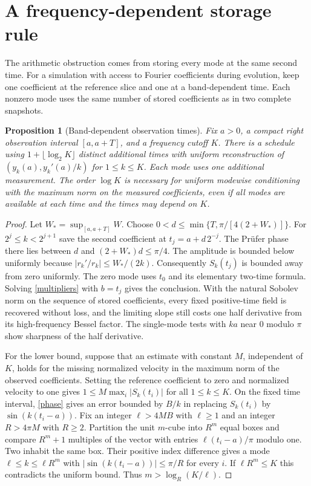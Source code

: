 \documentclass[11pt]{article}
\newtheorem{proposition}{Proposition}
\begin{document}
\section{A frequency-dependent storage rule}
\label{schedule}
The arithmetic obstruction comes from storing every mode at the
same second time. For a simulation with access to Fourier coefficients
during evolution, keep one coefficient at the reference slice and
one at a band-dependent time. Each nonzero mode uses the same number
of stored coefficients as in two complete snapshots.

\begin{proposition}[Band-dependent observation times]
Fix $a>0$, a compact right observation interval $[a,a+T]$, and a
frequency cutoff $K$. There is a schedule using
$1+\lfloor\log_2 K\rfloor$ distinct additional times with uniform
reconstruction of $(y_k(a),y_k'(a)/k)$ for $1\le k\le K$.
Each mode uses one additional measurement.
The order $\log K$ is necessary for uniform modewise conditioning
with the maximum norm on the measured coefficients, even if all modes
are available at each time and the times may depend on $K$.
\end{proposition}

\begin{proof}
Let $W_* = \sup_{[a,a+T]} W$. Choose $0<d\le
\min\{T,\pi/[4(2+W_*)]\}$. For $2^j\le k<2^{j+1}$
save the second coefficient at $t_j=a+d\,2^{-j}$.
The Pr\"ufer phase there lies between $d$ and $(2+W_*)d\le\pi/4$.
The amplitude is bounded below uniformly because
$|r_k'/r_k|\le W_*/(2k)$.
Consequently $S_k(t_j)$ is bounded away from zero uniformly.
The zero mode uses $t_0$ and its elementary two-time formula.
Solving \eqref{multipliers} with $b=t_j$ gives the conclusion.
With the natural Sobolev norm on the sequence of stored coefficients,
every fixed positive-time field is recovered without loss, and the
limiting slope still costs one half derivative from its high-frequency
Bessel factor. The single-mode tests with $ka$ near $0$ modulo $\pi$
show sharpness of the half derivative.

For the lower bound, suppose that an estimate with constant $M$,
independent of $K$, holds for the missing normalized velocity in the
maximum norm of the observed coefficients. Setting the reference
coefficient to zero and normalized velocity to one gives
$1\le M\max_i |S_k(t_i)|$ for all $1\le k\le K$.
On the fixed time interval, \eqref{phase} gives an error bounded by
$B/k$ in replacing $S_k(t_i)$ by $\sin(k(t_i-a))$.
Fix an integer $\ell> 4MB$ with $\ell\ge1$ and an integer
$R>4\pi M$ with $R\ge2$.
Partition the unit $m$-cube into $R^m$ equal boxes and compare
$R^m+1$ multiples of the vector with entries
$\ell(t_i-a)/\pi$ modulo one. Two inhabit the same box.
Their positive index difference gives a mode
$\ell\le k\le \ell R^m$ with $|\sin(k(t_i-a))|\le\pi/R$
for every $i$. If $\ell R^m\le K$ this contradicts the uniform
bound. Thus $m>\log_R(K/\ell)$.
\end{proof}
\end{document}

